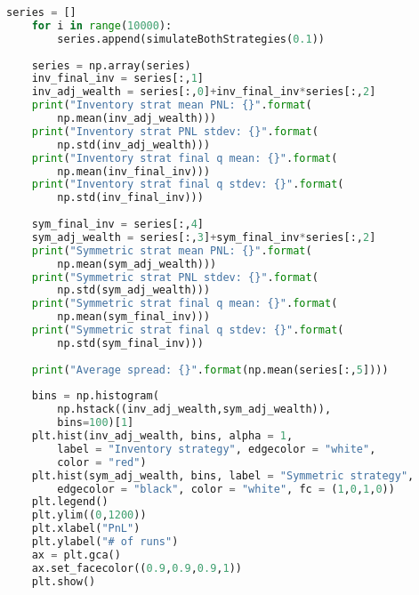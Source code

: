 \begin{lstlisting}[language=Python, caption=Run and report results]
    series = []
    for i in range(10000):
        series.append(simulateBothStrategies(0.1))
    
    series = np.array(series)
    inv_final_inv = series[:,1]
    inv_adj_wealth = series[:,0]+inv_final_inv*series[:,2]
    print("Inventory strat mean PNL: {}".format(
        np.mean(inv_adj_wealth)))
    print("Inventory strat PNL stdev: {}".format(
        np.std(inv_adj_wealth)))
    print("Inventory strat final q mean: {}".format(
        np.mean(inv_final_inv)))
    print("Inventory strat final q stdev: {}".format(
        np.std(inv_final_inv)))
    
    sym_final_inv = series[:,4]
    sym_adj_wealth = series[:,3]+sym_final_inv*series[:,2]
    print("Symmetric strat mean PNL: {}".format(
        np.mean(sym_adj_wealth)))
    print("Symmetric strat PNL stdev: {}".format(
        np.std(sym_adj_wealth)))
    print("Symmetric strat final q mean: {}".format(
        np.mean(sym_final_inv)))
    print("Symmetric strat final q stdev: {}".format(
        np.std(sym_final_inv)))
    
    print("Average spread: {}".format(np.mean(series[:,5])))
    
    bins = np.histogram(
        np.hstack((inv_adj_wealth,sym_adj_wealth)), 
        bins=100)[1] 
    plt.hist(inv_adj_wealth, bins, alpha = 1, 
        label = "Inventory strategy", edgecolor = "white", 
        color = "red")
    plt.hist(sym_adj_wealth, bins, label = "Symmetric strategy", 
        edgecolor = "black", color = "white", fc = (1,0,1,0))
    plt.legend()
    plt.ylim((0,1200))
    plt.xlabel("PnL")
    plt.ylabel("# of runs")
    ax = plt.gca()
    ax.set_facecolor((0.9,0.9,0.9,1))
    plt.show()
\end{lstlisting}
